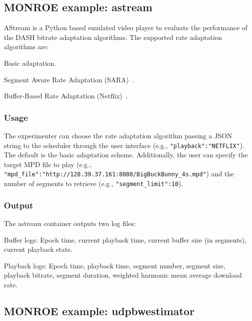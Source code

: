 \documentclass[a4paper,10pt]{article}
\newcommand{\monroe}{MONROE}
\newcommand{\identifier}[1]{{\texttt{\small{#1}}}}
\begin{document}
\subsection{\monroe{} example: astream}

AStream is a Python based emulated video player to evaluate the performance of the DASH bitrate adaptation algorithms.
The supported rate adaptation algorithms are:

\begin{itemize*}
	\item Basic adaptation.
	\item Segment Aware Rate Adaptation (SARA)~\cite{p:juluri2015}.
	\item Buffer-Based Rate Adaptation (Netflix)~\cite{p:teyuan2014}.
\end{itemize*}

\subsubsection{Usage}

The experimenter can choose the rate adaptation algorithm passing a JSON string to the scheduler through the user interface (e.g., \identifier{"playback":"NETFLIX"}).
The default is the basic adaptation scheme.
Additionally, the user can specify the target MPD file to play (e.g., \identifier{"mpd\_file":"http://128.39.37.161:8080/BigBuck\-Bunny\_4s.mpd"}) and the number of segments to retrieve (e.g., \identifier{"segment\_limit":10}).

\subsubsection{Output}

The astream container outputs two log files:
\begin{enumerate*}
	\item Buffer logs: Epoch time, current playback time, current buffer size (in segments), current playback state.
	\item Playback logs: Epoch time, playback time, segment number, segment size, playback bitrate, segment duration, weighted harmonic mean average download rate.
\end{enumerate*}


\subsection{\monroe{} example: udpbwestimator}
\end{document}
